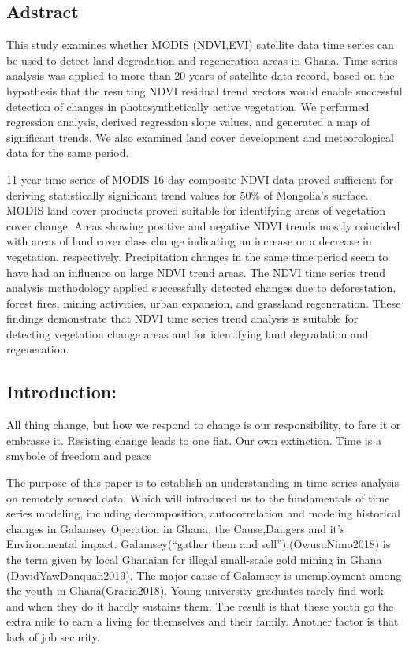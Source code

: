 \documentclass[10pt]{report}
\begin{document}
\hypertarget{adstract}{%
\subsection{Adstract}\label{adstract}}

This study examines whether MODIS (NDVI,EVI) satellite data time series
can be used to detect land degradation and regeneration areas in Ghana.
Time series analysis was applied to more than 20 years of satellite data
record, based on the hypothesis that the resulting NDVI residual trend
vectors would enable successful detection of changes in
photosynthetically active vegetation. We performed regression analysis,
derived regression slope values, and generated a map of significant
trends. We also examined land cover development and meteorological data
for the same period.

11-year time series of MODIS 16-day composite NDVI data proved
sufficient for deriving statistically significant trend values for 50\%
of Mongolia's surface. MODIS land cover products proved suitable for
identifying areas of vegetation cover change. Areas showing positive and
negative NDVI trends mostly coincided with areas of land cover class
change indicating an increase or a decrease in vegetation, respectively.
Precipitation changes in the same time period seem to have had an
influence on large NDVI trend areas. The NDVI time series trend analysis
methodology applied successfully detected changes due to deforestation,
forest fires, mining activities, urban expansion, and grassland
regeneration. These findings demonstrate that NDVI time series trend
analysis is suitable for detecting vegetation change areas and for
identifying land degradation and regeneration.

\hypertarget{introduction}{%
\subsection{Introduction:}\label{introduction}}

All thing change, but how we respond to change is our responsibility, to
fare it or embrasse it. Resisting change leads to one fiat. Our own
extinction. Time is a smybole of freedom and peace

The purpose of this paper is to establish an understanding in time
series analysis on remotely sensed data. Which will introduced us to the
fundamentals of time series modeling, including decomposition,
autocorrelation and modeling historical changes in Galamsey Operation in
Ghana, the Cause,Dangers and it's Environmental impact.
Galamsey(``gather them and sell''),(OwusuNimo2018) is the term given by
local Ghanaian for illegal small-scale gold mining in Ghana
(DavidYawDanquah2019). The major cause of Galamsey is unemployment among
the youth in Ghana(Gracia2018). Young university graduates rarely find
work and when they do it hardly sustains them. The result is that these
youth go the extra mile to earn a living for themselves and their
family. Another factor is that lack of job security.
\end{document}

